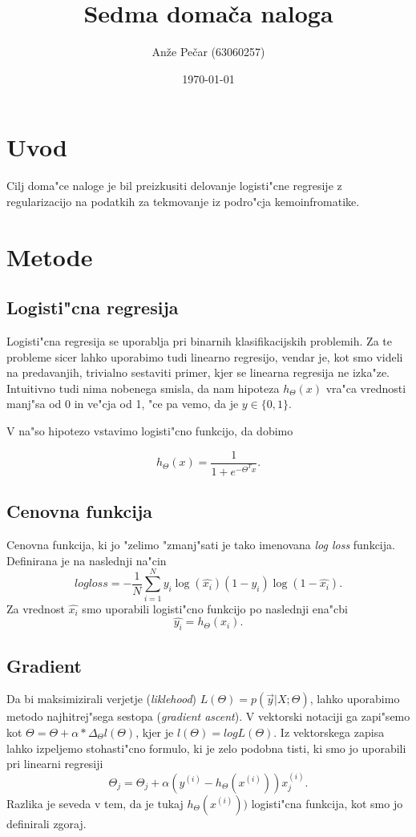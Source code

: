 \documentclass[a4paper,11pt]{article}
\title{Sedma domača naloga}
\author{Anže Pečar (63060257)}
\date{\today}
\begin{document}
\maketitle

\section{Uvod}
Cilj doma"ce naloge je bil preizkusiti delovanje logisti"cne regresije z regularizacijo na podatkih za tekmovanje iz podro"cja kemoinfromatike.
\section{Metode}
\subsection{Logisti"cna regresija}
Logisti"cna regresija se uporablja pri binarnih klasifikacijskih problemih. Za te probleme sicer lahko uporabimo tudi linearno regresijo, vendar je, kot smo videli na predavanjih, trivialno sestaviti primer, kjer se linearna regresija ne izka"ze. Intuitivno tudi nima nobenega smisla, da nam hipoteza $h_\Theta(x)$ vra"ca vrednosti manj"sa od 0 in ve"cja od 1, "ce pa vemo, da je $y \in \{0, 1\}$.

V na"so hipotezo vstavimo logisti"cno funkcijo, da dobimo 

\[
	h_\Theta(x) = \frac{1}{1 + e^{-\Theta^Tx}}.
\]


\subsection{Cenovna funkcija}

Cenovna funkcija, ki jo "zelimo "zmanj"sati je tako imenovana \textit{log loss} funkcija. Definirana je na naslednji na"cin
\[
logloss = -\frac{1}{N}\sum_{i=1}^Ny_i\log\left(\hat{x_i}\right)\left(1-y_i\right)\log\left(1-\hat{x_i}\right).
\]
Za vrednost $\hat{x_i}$ smo uporabili logisti"cno funkcijo po naslednji ena"cbi
\[
	\hat{y_i} = h_\Theta(x_i).
\]


\subsection{Gradient}
Da bi maksimizirali verjetje (\textit{liklehood}) $L(\Theta) = p(\vec{y} |X;\Theta)$, lahko uporabimo metodo najhitrej"sega sestopa (\textit{gradient ascent}). V vektorski notaciji ga zapi"semo kot $\Theta = \Theta + \alpha*\Delta_\Theta l(\Theta)$, kjer je $l(\Theta) = log L(\Theta)$. Iz vektorskega zapisa lahko izpeljemo stohasti"cno formulo, ki je zelo podobna tisti, ki smo jo uporabili pri linearni regresiji
\[
	\Theta_j = \Theta_j + \alpha(y^{(i)} - h_\Theta(x^{(i)}))x^{(i)}_j.
\]
Razlika je seveda v tem, da je tukaj $h_\Theta(x^{(i)}))$ logisti"cna funkcija, kot smo jo definirali zgoraj.
\end{document}
